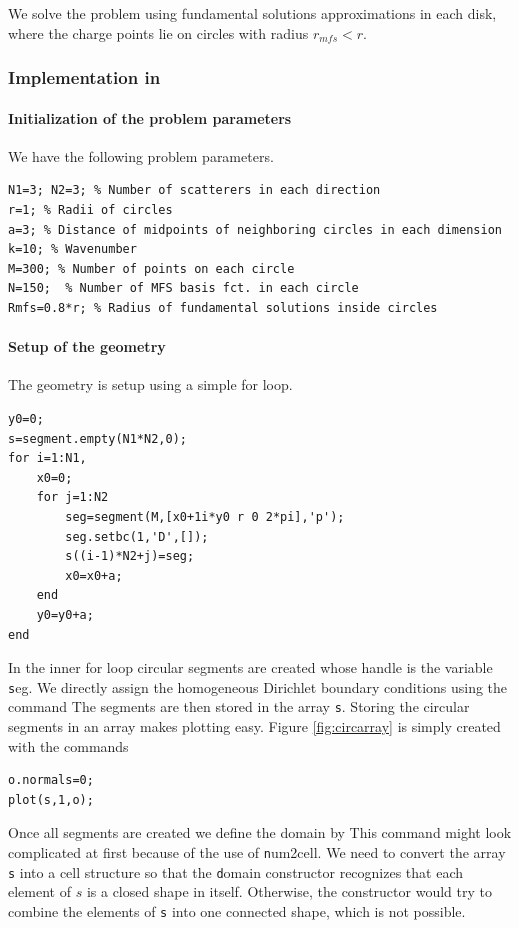 We solve the problem using fundamental solutions approximations in
each disk, where the charge  points lie on circles with radius $r_{mfs}<r$.

\subsubsection{Implementation in \mpspack}

\paragraph{Initialization of the problem parameters}

We have the following problem parameters.
\begin{verbatim}
N1=3; N2=3; % Number of scatterers in each direction
r=1; % Radii of circles
a=3; % Distance of midpoints of neighboring circles in each dimension
k=10; % Wavenumber
M=300; % Number of points on each circle
N=150;  % Number of MFS basis fct. in each circle
Rmfs=0.8*r; % Radius of fundamental solutions inside circles
\end{verbatim}

\paragraph{Setup of the geometry}

The geometry is setup using a simple for loop.
\begin{verbatim}
y0=0;
s=segment.empty(N1*N2,0);
for i=1:N1,
    x0=0;
    for j=1:N2
        seg=segment(M,[x0+1i*y0 r 0 2*pi],'p');
        seg.setbc(1,'D',[]);
        s((i-1)*N2+j)=seg;
        x0=x0+a;
    end
    y0=y0+a;
end
\end{verbatim}
In the inner for loop circular segments are created whose handle is
the variable {\texttt seg}. We directly assign the homogeneous
Dirichlet boundary conditions using the command 
The segments are then stored in the array
{\texttt s}. Storing the circular segments in an array makes plotting
easy. Figure \ref{fig:circarray} is simply created with the commands
\begin{verbatim}
o.normals=0;
plot(s,1,o);
\end{verbatim}
Once all segments are created we define the domain by
This command might look complicated at first because of the use of
{\texttt num2cell}. We need to convert the array {\texttt s} into a
cell structure so that the {\texttt domain} constructor recognizes
that each element of $s$ is a closed shape in itself. Otherwise, the
constructor would try to combine the elements of {\texttt s} into one
connected shape, which is not possible.


